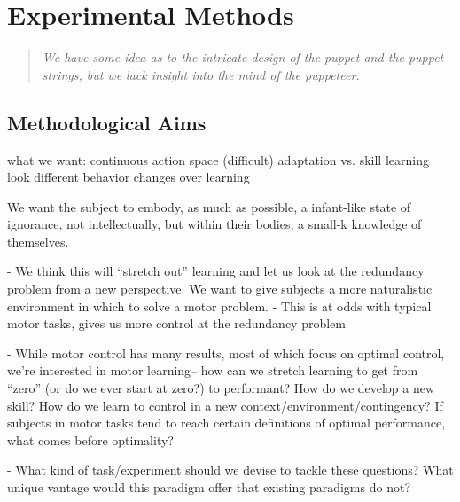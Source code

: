 \documentclass[../main.tex]{subfiles}
\begin{document}
\chapter{Experimental Methods}\label{chap:methods}


\bigskip
\begin{quote}
    \emph{We have some idea as to the intricate design of the puppet and the puppet strings, but we lack insight into the mind of the puppeteer.}
\end{quote}

\cleardoublepage%


\section{Methodological Aims}\label{methods_aims}

what we want:
	continuous action space (difficult)
	adaptation vs. skill learning look different
	behavior changes over learning

We want the subject to embody, as much as possible, a infant-like state of ignorance, not intellectually, but within their bodies, a small-k knowledge of themselves.

- We think this will “stretch out” learning and let us look at the redundancy problem from a new perspective. We want to give subjects a more naturalistic environment in which to solve a motor problem.
- This is at odds with typical motor tasks, gives us more control at the redundancy problem 

- While motor control has many results, most of which focus on optimal control, we’re interested in motor learning– how can we stretch learning to get from “zero” (or do we ever start at zero?) to performant? How do we develop a new skill? How do we learn to control in a new context/environment/contingency? If subjects in motor tasks tend to reach certain definitions of optimal performance, what comes before optimality?

- What kind of task/experiment should we devise to tackle these questions? What unique vantage would this paradigm offer that existing paradigms do not?
\end{document}
